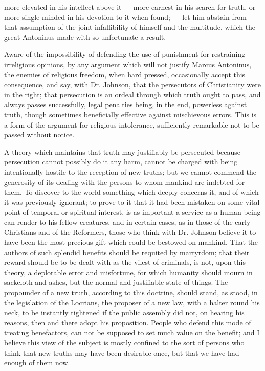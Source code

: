 \documentclass[12pt]{report}
\begin{document}
more elevated in his intellect above it — more earnest in his search for truth, or more single-minded in his devotion to it when found; — let him abstain from that assumption of the joint infallibility of himself and the multitude, which the great Antoninus made with so unfortunate a result.

Aware of the impossibility of defending the use of punishment for restraining irreligious opinions, by any argument which will not justify Marcus Antoninus, the enemies of religious freedom, when hard pressed, occasionally accept this consequence, and say, with Dr. Johnson, that the persecutors of Christianity were in the right; that persecution is an ordeal through which truth ought to pass, and always passes successfully, legal penalties being, in the end, powerless against truth, though sometimes beneficially effective against mischievous errors. This is a form of the argument for religious intolerance, sufficiently remarkable not to be passed without notice.

A theory which maintains that truth may justifiably be persecuted because persecution cannot possibly do it any harm, cannot be charged with being intentionally hostile to the reception of new truths; but we cannot commend the generosity of its dealing with the persons to whom mankind are indebted for them. To discover to the world something which deeply concerns it, and of which it was previously ignorant; to prove to it that it had been mistaken on some vital point of temporal or spiritual interest, is as important a service as a human being can render to his fellow-creatures, and in certain cases, as in those of the early Christians and of the Reformers, those who think with Dr. Johnson believe it to have been the most precious gift which could be bestowed on mankind. That the authors of such splendid benefits should be requited by martyrdom; that their reward should be to be dealt with as the vilest of criminals, is not, upon this theory, a deplorable error and misfortune, for which humanity should mourn in sackcloth and ashes, but the normal and justifiable state of things. The propounder of a new truth, according to this doctrine, should stand, as stood, in the legislation of the Locrians, the proposer of a new law, with a halter round his neck, to be instantly tightened if the public assembly did not, on hearing his reasons, then and there adopt his proposition. People who defend this mode of treating benefactors, can not be supposed to set much value on the benefit; and I believe this view of the subject is mostly confined to the sort of persons who think that new truths may have been desirable once, but that we have had enough of them now.
\end{document}
